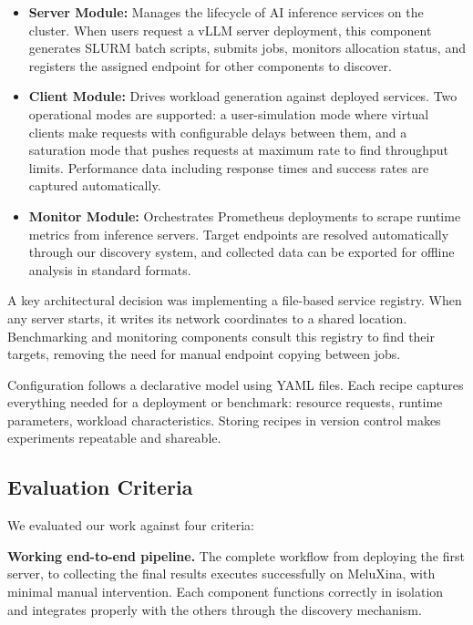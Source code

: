 \documentclass[12pt,a4paper]{article}
\begin{document}
\begin{itemize}
    \item \textbf{Server Module:} Manages the lifecycle of AI inference services on the cluster. When users request a vLLM server deployment, this component generates SLURM batch scripts, submits jobs, monitors allocation status, and registers the assigned endpoint for other components to discover.
    
    \item \textbf{Client Module:} Drives workload generation against deployed services. Two operational modes are supported: a user-simulation mode where virtual clients make requests with configurable delays between them, and a saturation mode that pushes requests at maximum rate to find throughput limits. Performance data including response times and success rates are captured automatically.
    
    \item \textbf{Monitor Module:} Orchestrates Prometheus deployments to scrape runtime metrics from inference servers. Target endpoints are resolved automatically through our discovery system, and collected data can be exported for offline analysis in standard formats.
\end{itemize}

A key architectural decision was implementing a file-based service registry. When any server starts, it writes its network coordinates to a shared location. Benchmarking and monitoring components consult this registry to find their targets, removing the need for manual endpoint copying between jobs.

Configuration follows a declarative model using YAML files. Each recipe captures everything needed for a deployment or benchmark: resource requests, runtime parameters, workload characteristics. Storing recipes in version control makes experiments repeatable and shareable.

\subsection{Evaluation Criteria}

We evaluated our work against four criteria:

\textbf{Working end-to-end pipeline.} The complete workflow from deploying the first server, to collecting the final results executes successfully on MeluXina, with minimal manual intervention. Each component functions correctly in isolation and integrates properly with the others through the discovery mechanism.
\end{document}
